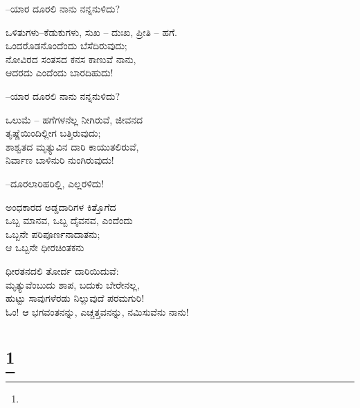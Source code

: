 \begin{flushright}
–ಯಾರ ದೂರಲಿ ನಾನು ನನ್ನನುಳಿದು?
\end{flushright}

\begin{myquote}
ಒಳಿತುಗಳು–ಕೆಡುಕುಗಳು, ಸುಖ – ದುಃಖ, ಪ್ರೀತಿ – ಹಗೆ.\\ಒಂದರೊಡನೊಂದೆಂದು ಬೆಸೆದಿರುವುದು;\\ನೋವಿರದ ಸಂತಸದ ಕನಸ ಕಾಣುವೆ ನಾನು,\\ಆದರದು ಎಂದೆಂದು ಬಾರದಿಹುದು!
\end{myquote}

\begin{flushright}
–ಯಾರ ದೂರಲಿ ನಾನು ನನ್ನನುಳಿದು?
\end{flushright}

\begin{myquote}
ಒಲುಮೆ – ಹಗೆಗಳನೆಲ್ಲ ನೀಗಿರುವೆ, ಜೀವನದ\\ತೃಷ್ಣೆಯಿಂದಿಲ್ಲೀಗ ಬತ್ತಿರುವುದು;\\ಶಾಶ್ವತದ ಮೃತ್ಯುವಿನ ದಾರಿ ಕಾಯುತಲಿರುವೆ,\\ನಿರ್ವಾಣ ಬಾಳಿನುರಿ ನುಂಗಿರುವುದು!
\end{myquote}

\begin{flushright}
–ದೂರಲಾರಿಹರಿಲ್ಲಿ, ಎಲ್ಲರಳಿದು!
\end{flushright}

\begin{myquote}
ಅಂಧಕಾರದ ಅಡ್ಡದಾರಿಗಳ ಕಿತ್ತೊಗೆದ\\ಒಬ್ಬ ಮಾನವ, ಒಬ್ಬ ದೈವನವ, ಎಂದೆಂದು\\ಒಬ್ಬನೇ ಪರಿಪೂರ್ಣನಾದಾತನು;\\ಆ ಒಬ್ಬನೇ ಧೀರಚಿಂತಕನು
\end{myquote}

\begin{myquote}
ಧೀರತನದಲಿ ತೋರ್ದ ದಾರಿಯಿದುವೆ:\\ಮೃತ್ಯುವೆಂಬುದು ಶಾಪ, ಬದುಕು ಬೇರೇನಲ್ಲ,\\ಹುಟ್ಟು ಸಾವುಗಳೆರಡು ನಿಲ್ಲುವುದೆ ಪರಮಗುರಿ!\\ಓಂ! ಆ ಭಗವಂತನನ್ನು, ಎಚ್ಚತ್ತವನನ್ನು, ನಮಿಸುವೆನು ನಾನು!
\end{myquote}

\selecteng

\chapter[KALI THE MOTHER]{\protect\footnote{}}

